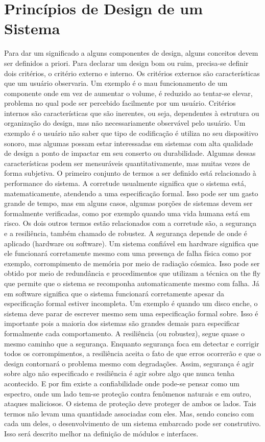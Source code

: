 \section{Princípios de Design de um Sistema}
Para dar um significado a alguns componentes de design, alguns conceitos devem ser definidos a priori.
Para declarar um design bom ou ruim, precisa-se definir dois critérios, o critério externo e interno.
Os critérios externos são características que um usuário observaria. Um exemplo é o mau funcionamento de um componente onde em vez de aumentar o volume, é reduzido ao tentar-se elevar, problema no qual pode ser percebido facilmente por um usuário. Critérios internos são características que são inerentes, ou seja, dependentes à estrutura ou organização do design, mas não necessariamente observável pelo usuário. Um exemplo é o usuário não saber que tipo de codificação é utiliza no seu dispositivo sonoro, mas algumas possam estar interessadas em sistemas com alta qualidade de design a ponto de impactar em seu conserto ou durabilidade. Algumas dessas características podem ser mensuráveis quantitativamente, mas muitas vezes de forma subjetiva.
O primeiro conjunto de termos a ser definido está relacionado à performance do sistema. A corretude usualmente significa que o sistema está, matematicamente, atendendo a uma especificação formal. Isso pode ser um gasto grande de tempo, mas em alguns casos, algumas porções de sistemas devem ser formalmente verificadas, como por exemplo quando uma vida humana está em risco. Os dois outros termos estão relacionados com a corretude são, a segurança e a resiliência, também chamado de robustez. A segurança depende de onde é aplicado (hardware ou software). Um sistema confiável em hardware significa que ele funcionará corretamente mesmo com uma presença de falha física como por exemplo, corrompimento de memória por meio de radiação cósmica. Isso pode ser obtido por meio de redundância e procedimentos que utilizam a técnica on the fly que permite que o sistema se recomponha automaticamente mesmo com falha. Já em software significa que o sistema funcionará corretamente apesar da especificação formal estiver incompleta. Um exemplo é quando um disco enche, o sistema deve parar de escrever mesmo sem uma especificação formal sobre. Isso é importante pois a maioria dos sistemas são grandes demais para especificar formalmente cada comportamento. A resiliência (ou robustez), segue quase o mesmo caminho que a segurança. Enquanto segurança foca em detectar e corrigir todos os corrompimentos, a resiliência aceita o fato de que erros ocorrerão e que o design contornará o problema mesmo com degradações. Assim, segurança é agir sobre algo não especificado e resiliência é agir sobre algo que nunca tenha acontecido. E por fim existe a confiabilidade onde pode-se pensar como um espectro, onde um lado tem-se proteção contra fenômenos naturais e em outro, ataques maliciosos. O sistema de proteção deve proteger de ambos os lados. 
Tais termos não levam uma quantidade associadas com eles. Mas, sendo conciso com cada um deles, o desenvolvimento de um sistema embarcado pode ser construtivo. Isso será descrito melhor na definição de módulos e interfaces.


